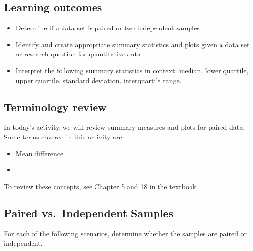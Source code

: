 \documentclass[
]{report}
\begin{document}

\subsection{Learning outcomes}\label{learning-outcomes}

\begin{itemize}
\item
  Determine if a data set is paired or two independent samples
\item
  Identify and create appropriate summary statistics and plots
  given a data set or research question for quantitative data.
\item
  Interpret the following summary statistics in context:
  median, lower quartile, upper quartile,
  standard deviation, interquartile range.
\end{itemize}

\subsection{Terminology review}\label{terminology-review}

In today's activity, we will review summary measures and plots for paired data. Some terms covered in this activity are:

\begin{itemize}
\item
  Mean difference
\item
\end{itemize}

To review these concepts, see Chapter 5 and 18 in the textbook.

\subsection{Paired vs.~Independent Samples}\label{paired-vs.-independent-samples-1}

For each of the following scenarios, determine whether the samples are paired or independent.
\end{document}

